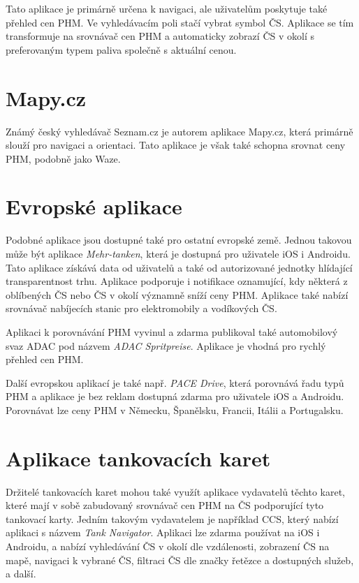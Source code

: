 Tato aplikace je primárně určena k navigaci, ale uživatelům poskytuje
také přehled cen PHM. Ve vyhledávacím poli stačí vybrat symbol ČS.
Aplikace se tím transformuje na srovnávač cen PHM a automaticky zobrazí
ČS v okolí s preferovaným typem paliva společně s aktuální cenou.
\cite{Vrablova2022}

\section{Mapy.cz}
\label{sec:mapy}

Známý český vyhledávač Seznam.cz je autorem aplikace Mapy.cz, která
primárně slouží pro navigaci a orientaci. Tato aplikace je však také
schopna srovnat ceny PHM, podobně jako Waze.
\cite{Vrablova2023}

\section{Evropské aplikace}
\label{sec:european-apps}

Podobné aplikace jsou dostupné také pro ostatní evropské země. Jednou
takovou může být aplikace \emph{Mehr-tanken}, která je dostupná
pro uživatele iOS i Androidu. Tato aplikace získává data od uživatelů
a také od autorizované jednotky hlídající transparentnost trhu.
Aplikace podporuje i notifikace oznamující, kdy některá z oblíbených
ČS nebo ČS v okolí významně sníží ceny PHM. Aplikace také nabízí
srovnávač nabíjecích stanic pro elektromobily a vodíkových ČS.
\cite{r6fadX3YRnFIir68}

Aplikaci k porovnávání PHM vyvinul a zdarma publikoval také automobilový
svaz ADAC pod názvem \emph{ADAC Spritpreise}. Aplikace je vhodná pro rychlý
přehled cen PHM.
\cite{r6fadX3YRnFIir68}

Další evropskou aplikací je také např. \emph{PACE Drive}, která
porovnává řadu typů PHM a aplikace je bez reklam dostupná zdarma
pro uživatele iOS a Androidu. Porovnávat lze ceny PHM v Německu,
Španělsku, Francii, Itálii a Portugalsku.
\cite{r6fadX3YRnFIir68}

\section{Aplikace tankovacích karet}
\label{sec:tank-card-apps}

Držitelé tankovacích karet mohou také využít aplikace vydavatelů těchto
karet, které mají v sobě zabudovaný srovnávač cen PHM na ČS podporující
tyto tankovací karty. Jedním takovým vydavatelem je například CCS, který
nabízí aplikaci s názvem \emph{Tank Navigator}. Aplikaci lze zdarma
používat na iOS i Androidu, a nabízí vyhledávání ČS v okolí dle vzdálenosti,
zobrazení ČS na mapě, navigaci k vybrané ČS, filtraci ČS dle značky řetězce
a dostupných služeb, a další.
\cite{Khcm5FZT2rH5pABQ}

\endinput
